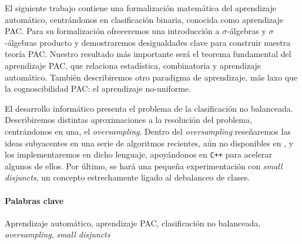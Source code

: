 El siguiente trabajo contiene una formalización matemática del aprendizaje automático, centrándonos en clasificación binaria,
conocida como aprendizaje PAC. Para su formalización ofreceremos una introducción a $\sigma$-álgebras y $\sigma$-álgebras producto y demostraremos desigualdades
clave para construir nuestra teoría PAC. Nuestro resultado más importante será el teorema fundamental del
aprendizaje PAC, que relaciona estadística, combinatoria y aprendizaje automático. También describiremos otro paradigma de aprendizaje,
más laxo que la cognoscibilidad PAC: el aprendizaje no-uniforme.

El desarrollo informático presenta el problema de la clasificación no balanceada. Describiremos distintas aproximaciones 
a la resolución del problema, centrándonos en una, el \textit{oversampling}. Dentro del \textit{oversampling} reseñaremos
las ideas subyacentes en una serie de algoritmos recientes, aún no disponibles en \R, y los implementaremos en dicho 
lenguaje, apoyándonos en \texttt{C++} para acelerar algunos de ellos. Por último, se hará una pequeña experimentación
con \textit{small disjuncts}, un concepto estrechamente ligado al debalanceo de clases.

\paragraph{Palabras clave}
Aprendizaje automático, aprendizaje PAC, clasificación no balanceada, \textit{oversampling}, \textit{small disjuncts}